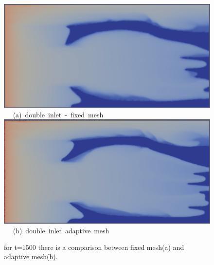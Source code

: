 \begin{landscape}
\begin{figure}[ht] 
\vbox{
\hbox{\hspace{3.5cm}
\includegraphics[width=.8\textwidth]{./Pics1/5reg_dinlet_fixed_1500.pdf} 
}
\vspace{0.0cm}
\hbox{\hspace{6.5cm} (a) double inlet - fixed mesh   
}
\hbox{\hspace{3.5cm}
\includegraphics[width=.8\textwidth]{./Pics1/5reg_dinlet_adapt_1500.pdf}
}
\vspace{0.0cm}
\hbox{\hspace{6.5cm} (b) double inlet adaptive mesh   
}
}     
\caption{for t=$1500$ there is a comparison between fixed mesh(a) and adaptive mesh(b).}
\label{fig:3testcase_c}
\end{figure}
\end{landscape}
\clearpage

